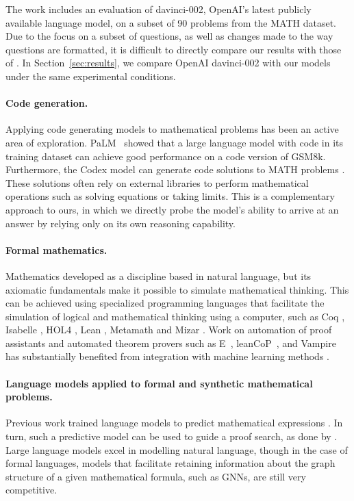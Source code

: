 \documentclass{article}
\begin{document}
The work \cite{ocw_codex} includes an evaluation of davinci-002, OpenAI's latest publicly available language model, on a subset of 90 problems from the MATH dataset. Due to the focus on a subset of questions, as well as changes made to the way questions are formatted, it is difficult to directly compare our results with those of \cite{ocw_codex}. In Section~\ref{sec:results}, we compare OpenAI davinci-002 with our models under the same experimental conditions.

\paragraph{Code generation.}
Applying code generating models to mathematical problems has been an active area of exploration. PaLM~\cite{palm} showed that a large language model with code in its training dataset can achieve good performance on a code version of GSM8k. Furthermore, the Codex model \citep{codex} can generate code solutions to MATH problems \cite{ocw_codex}. 
These solutions often rely on external libraries to perform mathematical operations such as solving equations or taking limits.
This is a complementary approach to ours, in which we directly probe the model's ability to arrive at an answer by relying only on its own reasoning capability.


\paragraph{Formal mathematics.}
Mathematics developed as a discipline based in natural language, but its axiomatic fundamentals make it possible to simulate mathematical thinking. This can be achieved using specialized programming languages that facilitate the simulation of logical and mathematical thinking using a computer, such as Coq \citep{coq}, Isabelle \citep{isabelle}, HOL4 \citep{hollight}, Lean \citep{lean}, Metamath \citep{metamath} and Mizar \citep{mizar}.
Work on automation of proof assistants and automated theorem provers such as E~\citep{eprover}, leanCoP~\citep{leancop}, and Vampire~\citep{vampire} has substantially benefited from integration with machine learning methods \citep{deepmath, enigma, isarstep, gptf, rlcop}.

\paragraph{Language models applied to formal and synthetic mathematical problems.} 
Previous work trained language models to predict mathematical expressions \cite{skip_trees, isarstep, gptf, lime2021, han2022pact,formal_curriculum,thor,autoform_llm}. In turn, such a predictive model can be used to guide a proof search, as done by \cite{gptf}. Large language models excel in modelling natural language, though in the case of formal languages, models that facilitate retaining information about the graph structure of a given mathematical formula, such as GNNs, are still very competitive.
\end{document}
